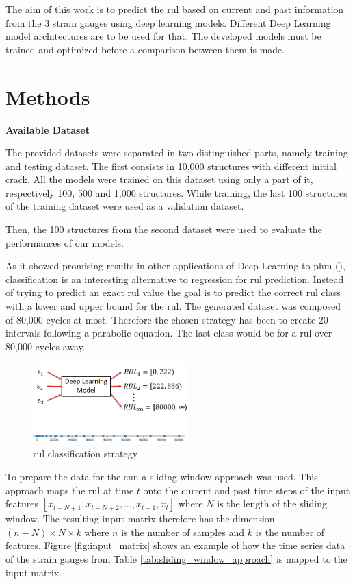 \documentclass[conference]{IEEEtran}
\begin{document}
The aim of this work is to predict the \gls{rul} based on current and past information from the 3 strain gauges using deep learning models. Different Deep Learning model architectures are to be used for that. The developed models must be trained and optimized before a comparison between them is made.

\section{Methods}
\label{sec:methods}

\noindent
\textbf{Available Dataset}

The provided datasets were separated in two distinguished parts, namely training and testing dataset. The first consists in 10,000 structures with different initial crack. All the models were trained on this dataset using only a part of it, respectively 100, 500 and 1,000 structures. While training, the last 100 structures of the training dataset were used as a validation dataset.

Then, the 100 structures from the second dataset were used to evaluate the performances of our models.


As it showed promising results in other applications of Deep Learning to \gls{phm} (\cite{Liu2019a, Xiao2016}), classification is an interesting alternative to regression for \gls{rul} prediction. Instead of trying to predict an exact \gls{rul} value the goal is to predict the correct \gls{rul} class with a lower and upper bound for the \gls{rul}. The generated dataset was composed of 80,000 cycles at most. Therefore the chosen strategy has been to create 20 intervals following a parabolic equation. The last class would be for a \gls{rul} over 80,000 cycles away.


\begin{figure}[htp]
	\centering
	\includegraphics[width=6cm]{RUL_Classification.png}
	\caption{\gls{rul} classification strategy}
	\label{fig:RNN-classification}
\end{figure}


To prepare the data for the \gls{cnn} a sliding window approach was used. This approach maps the \gls{rul} at time $ t $ onto the current and past time steps of the input features $ [x_{t-N+1}, x_{t-N+2},..., x_{t-1}, x_t] $ where $ N $ is the length of the sliding window. The resulting input matrix therefore has the dimension $ (n-N) \times N \times k $ where $ n $ is the number of samples and $ k $ is the number of features. Figure \ref{fig:input_matrix} shows an example of how the time series data of the strain gauges from Table \ref{tab:sliding_window_approach} is mapped to the input matrix.
\end{document}
